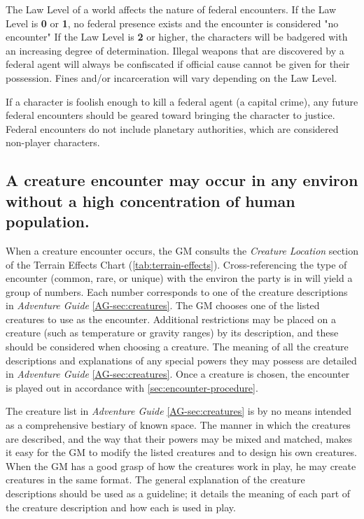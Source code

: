 The Law Level of a world affects the nature of federal encounters. If
the Law Level is \textbf{0} or \textbf{1}, no federal presence exists
and the encounter is considered "no encounter" If the Law Level is
\textbf{2} or higher, the characters will be badgered with an
increasing degree of determination. Illegal weapons that are
discovered by a federal agent will always be confiscated if official
cause cannot be given for their possession. Fines and/or incarceration
will vary depending on the Law Level.

If a character is foolish enough to kill a federal agent (a capital
crime), any future federal encounters should be geared toward bringing
the character to justice. Federal encounters do not include planetary
authorities, which are considered non-player characters.

\subsection[Creature Encounters]{A creature encounter may occur in any
  environ without a high concentration of human population.}
\label{sec:creature-encounters}


When a creature encounter occurs, the GM consults the \emph{Creature
  Location} section of the Terrain Effects Chart (\ref{tab:terrain-effects}).
Cross-referencing the type of encounter (common, rare, or unique) with
the environ the party is in will yield a group of numbers. Each number
corresponds to one of the creature descriptions in \emph{Adventure Guide} \ref{AG-sec:creatures}.
The GM chooses one of the listed creatures to use as the encounter.
Additional restrictions may be placed on a creature (such as
temperature or gravity ranges) by its description, and these should be
considered when choosing a creature. The meaning of all the creature
descriptions and explanations of any special powers they may possess
are detailed in \emph{Adventure Guide} \ref{AG-sec:creatures}. Once a creature is chosen, the
encounter is played out in accordance with \ref{sec:encounter-procedure}.

The creature list in \emph{Adventure Guide} \ref{AG-sec:creatures} is by no means intended as a
comprehensive bestiary of known space. The manner in which the
creatures are described, and the way that their powers may be mixed
and matched, makes it easy for the GM to modify the listed creatures
and to design his own creatures. When the GM has a good grasp of how
the creatures work in play, he may create creatures in the same
format. The general explanation of the creature descriptions should be
used as a guideline; it details the meaning of each part of the
creature description and how each is used in play.

